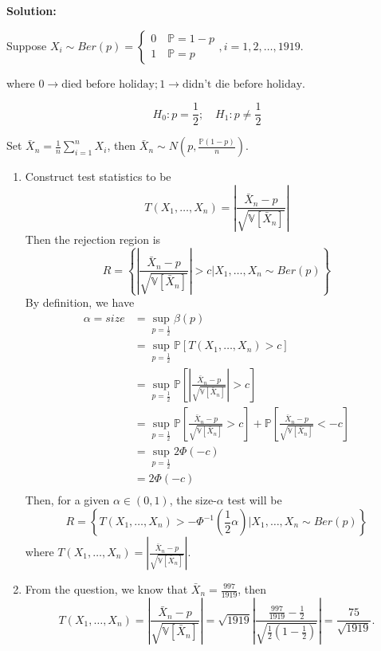 \documentclass[13pt]{article}
\theoremstyle{definition}
\newenvironment{solution}
{\color{C2}\begin{framed}\begingroup\textbf{Solution:} }
  {\endgroup\end{framed}}
\theoremstyle{remark}
\newcommand{\PP}{\mathbb{P}}
\newcommand{\VV}{\mathbb{V}}
\begin{document}
\begin{solution}

Suppose $X_i \sim Ber(p) = \begin{cases}0 \quad \PP = 1-p\\
1 \quad \PP = p\end{cases}, i=1,2,\ldots, 1919$.

where $0 \longrightarrow \text{died before holiday}; 1\longrightarrow \text{didn't die before holiday}$.

\[H_0: p=\frac{1}{2}; \quad H_1: p\not =\frac{1}{2}\]

Set $\bar{X}_n = \frac{1}{n}\sum_{i=1}^n X_i$, then $\bar{X}_n\sim N\left(p, \frac{\PP(1-p)}{n}\right)$.


\begin{enumerate}[label=(\alph*),topsep=0pt]
    \item Construct test statistics to be 
    \[
    T(X_1, \ldots, X_n) = \left|\frac{\bar{X}_n -p}{\sqrt{\VV[\bar{X}_n]}}\right|
    \]
    Then the rejection region is 
    \[
    R = \left\{\left|\frac{\bar{X}_n -p}{\sqrt{\VV[\bar{X}_n]}}\right|>c \Big|X_1, \ldots, X_n\sim Ber(p)\right\}
    \]
    By definition, we have
    \begin{align*}
        \alpha = size &= \sup_{p=\frac{1}{2}}\beta(p)\\
        &= \sup_{p=\frac{1}{2}}\PP[T(X_1, \ldots, X_n) > c]\\
        &= \sup_{p=\frac{1}{2}}\PP\left[\left|\frac{\bar{X}_n -p}{\sqrt{\VV[\bar{X}_n]}}\right| > c\right]\\
        &= \sup_{p=\frac{1}{2}}\PP\left[\frac{\bar{X}_n -p}{\sqrt{\VV[\bar{X}_n]}} > c\right]+\PP\left[\frac{\bar{X}_n -p}{\sqrt{\VV[\bar{X}_n]}} < -c\right]\\
        &= \sup_{p=\frac{1}{2}}2\Phi(-c)\\
        &= 2\Phi(-c)\\
    \end{align*}
    Then, for a given $\alpha\in (0,1)$, the size-$\alpha$ test will be 
    \[
    R = \left\{T(X_1,\ldots, X_n)>-\Phi^{-1}\left(\frac{1}{2}\alpha\right) \Big|X_1, \ldots, X_n\sim Ber(p)\right\}
    \]
    where $T(X_1, \ldots, X_n) = \left|\frac{\bar{X}_n -p}{\sqrt{\VV[\bar{X}_n]}}\right|$.
    \item From the question, we know that $\bar{X}_n = \frac{997}{1919}$, then \[T(X_1, \ldots, X_n) = \left|\frac{\bar{X}_n -p}{\sqrt{\VV[\bar{X}_n]}}\right|=\sqrt{1919}\left|\frac{\frac{997}{1919} -\frac{1}{2}}{\sqrt{\frac{1}{2}(1-\frac{1}{2})}}\right| = \frac{75}{\sqrt{1919}}.\]
    

\end{enumerate}
\end{solution}
\end{document}
